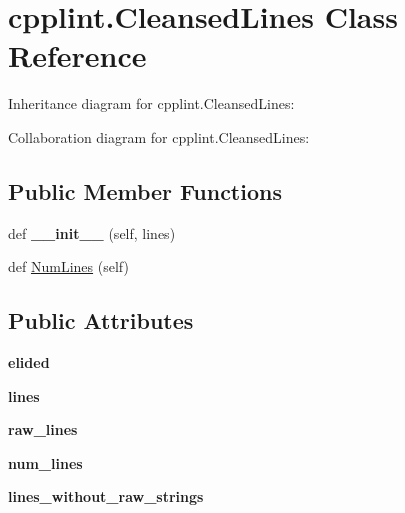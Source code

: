 \hypertarget{classcpplint_1_1CleansedLines}{}\section{cpplint.\+Cleansed\+Lines Class Reference}
\label{classcpplint_1_1CleansedLines}


Inheritance diagram for cpplint.\+Cleansed\+Lines\+:


Collaboration diagram for cpplint.\+Cleansed\+Lines\+:
\subsection*{Public Member Functions}
\begin{DoxyCompactItemize}
\item 
\mbox{\label{classcpplint_1_1CleansedLines_ad2bc06d9697e2bbfbc7e6b50878c8c8f}} 
def {\bfseries \+\_\+\+\_\+init\+\_\+\+\_\+} (self, lines)
\item 
def \hyperlink{classcpplint_1_1CleansedLines_a26a7eff70493d64d58d16f4a406c7ee9}{Num\+Lines} (self)
\end{DoxyCompactItemize}
\subsection*{Public Attributes}
\begin{DoxyCompactItemize}
\item 
\mbox{\label{classcpplint_1_1CleansedLines_aa4d0a4d5081675c01656a5d86d99e8bd}} 
{\bfseries elided}
\item 
\mbox{\label{classcpplint_1_1CleansedLines_a9cd74bd010da1610a46322d6821bd06a}} 
{\bfseries lines}
\item 
\mbox{\label{classcpplint_1_1CleansedLines_a9e94ce9e4f682be33c04fe82429c4dfd}} 
{\bfseries raw\+\_\+lines}
\item 
\mbox{\label{classcpplint_1_1CleansedLines_a4b42ab48659954fb6e0a4e4eb483a45a}} 
{\bfseries num\+\_\+lines}
\item 
\mbox{\label{classcpplint_1_1CleansedLines_a0cc228ba3c00ba590b27a759cf8023ce}} 
{\bfseries lines\+\_\+without\+\_\+raw\+\_\+strings}
\end{DoxyCompactItemize}



